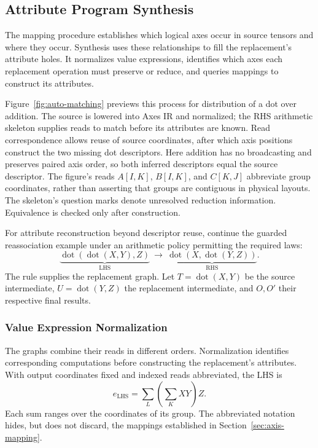 \FloatBarrier
\subsection{Attribute Program Synthesis}
\label{sec:synthesis}
The mapping procedure establishes which logical axes occur in source tensors
and where they occur. Synthesis uses these relationships to fill the
replacement's attribute holes. It normalizes value expressions, identifies
which axes each replacement operation must preserve or reduce, and queries
mappings to construct its attributes.

Figure~\ref{fig:auto-matching} previews this process for distribution of a dot
over addition. The source is lowered into Axes IR and normalized; the RHS
arithmetic skeleton supplies reads to match before its attributes are known.
Read correspondence allows reuse of source coordinates, after which axis
positions construct the two missing dot descriptors. Here addition has no
broadcasting and preserves paired axis order, so both inferred descriptors
equal the source descriptor. The figure's reads $A[I,K]$, $B[I,K]$, and
$C[K,J]$ abbreviate group coordinates, rather than asserting that groups are
contiguous in physical layouts. The skeleton's question marks denote unresolved
reduction information. Equivalence is checked only after construction.


For attribute reconstruction beyond descriptor reuse, continue the guarded
reassociation example under an arithmetic policy permitting the required laws:
\begin{equation}
 \underbrace{\operatorname{dot}(\operatorname{dot}(X,Y),Z)}_{\mathrm{LHS}}
 \ \longrightarrow\
 \underbrace{\operatorname{dot}(X,\operatorname{dot}(Y,Z))}_{\mathrm{RHS}}.
\end{equation}
The rule supplies the replacement graph. Let $T=\operatorname{dot}(X,Y)$ be
the source intermediate, $U=\operatorname{dot}(Y,Z)$ the replacement
intermediate, and $O,O'$ their respective final results.

\FloatBarrier
\subsubsection{Value Expression Normalization}
\label{sec:normalization}
The graphs combine their reads in different orders. Normalization identifies
corresponding computations before constructing the replacement's attributes.
With output coordinates fixed and indexed reads abbreviated, the LHS is
\begin{equation}
 e_{\mathrm{LHS}}=\sum_L\left(\sum_K XY\right)Z.
\end{equation}
Each sum ranges over the coordinates of its group. The abbreviated notation
hides, but does not discard, the mappings established in
Section~\ref{sec:axis-mapping}.

